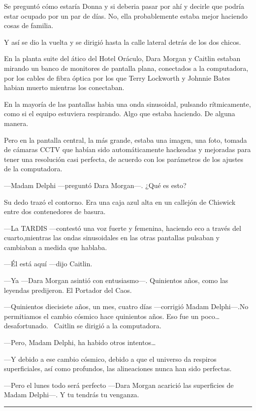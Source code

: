 Se preguntó cómo estaría Donna y si deberia pasar por ahí y decirle que
podría estar ocupado por un par de días. No, ella probablemente estaba
mejor haciendo cosas de familia.

Y así se dio la vuelta y se dirigió hasta la calle lateral detrás de los
dos chicos.

En la planta suite del ático del Hotel Oráculo, Dara Morgan y Caitlin
estaban mirando un banco de monitores de pantalla plana, conectados a la
computadora, por los cables de fibra óptica por los que Terry Lockworth
y Johnnie Bates habian muerto mientras los conectaban.

En la mayoría de las pantallas habia una onda sinusoidal, pulsando
rítmicamente, como si el equipo estuviera respirando. Algo que estaba
haciendo. De alguna manera.

Pero en la pantalla central, la más grande, estaba una imagen, una foto,
tomada de cámaras CCTV que habían sido automáticamente hackeadas y
mejoradas para tener una resolución casi perfecta, de acuerdo con los
parámetros de los ajustes de la computadora.

---Madam Delphi ---preguntó Dara Morgan---. ¿Qué es esto?

Su dedo trazó el contorno. Era una caja azul alta en un callejón de
Chiswick entre dos contenedores de basura.

---La TARDIS ---contestó una voz fuerte y femenina, haciendo eco a
través del cuarto,mientras las ondas sinusoidales en las otras pantallas
pulsaban y cambiaban a medida que hablaba.

---Él está aquí ---dijo Caitlin.

---Ya ---Dara Morgan asintió con entusiasmo---. Quinientos años, como
las leyendas predijeron. El Portador del Caos.

---Quinientos diecisiete años, un mes, cuatro días ---corrigió Madam
Delphi---.No permitiamos el cambio cósmico hace quinientos años. Eso fue
un poco\ldots{} desafortunado. ~Caitlin se dirigió a la computadora.

---Pero, Madam Delphi, ha habido otros intentos\ldots{}

---Y debido a ese cambio cósmico, debido a que el universo da respiros
superficiales, así como profundos, las alineaciones nunca han sido
perfectas.

---Pero el lunes todo será perfecto ---Dara Morgan acarició las
superficies de Madam Delphi---. Y tu tendrás tu venganza.

\begin{center}\rule{3in}{0.4pt}\end{center}

